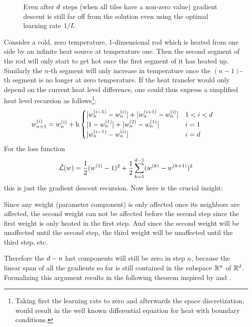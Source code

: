 \begin{figure}[h]
	\centering
	\def\svgwidth{1\textwidth}
	
	\caption{Even after \(d\) steps (when all tiles have a non-zero value)
	gradient descent is still far off from the solution even using the optimal
	learning rate \(1/L\)}
	\label{fig: visualize coloring problem}
\end{figure}
%
Consider a cold, zero temperature, 1-dimensional rod which is heated from one side
by an infinite heat source at temperature one. Then the second segment of the rod
will only start to get hot once the first segment of it has heated up. Similarly
the \(n\)-th segment will only increase in temperature once the \((n-1)\)-th segment
is no longer at zero temperature. If the heat transfer would only depend on the
current heat level difference, one could thus express a simplified heat level
recursion as follows\footnote{
	Taking first the learning rate to zero and afterwards the space discretization, would
	result in the well known differential equation for heat with boundary
	conditions.
}: 
%
\begin{align*}
	\weights_{n+1}^{(i)}
	&= \weights_{n}^{(i)}
	+ \lr 
	\begin{cases}
		[\weights_{n}^{(i-1)} - \weights_{n}^{(i)}] + [\weights_{n}^{(i+1)} - \weights_{n}^{(i)}]
		&  1 < i < \dimension \\
		[1 - \weights_{n}^{(1)}] + [\weights_{n}^{(2)} - \weights_{n}^{(1)}]
		& i = 1 \\
		[\weights_{n}^{(i-1)} - \weights_{n}^{(i)}]
		& i = \dimension
	\end{cases}
\end{align*}
%
For the loss function
%
\begin{align}\label{eq: naive complexity counterexample loss}
	\tilde{\mathcal{L}}(w)
	= \frac12 (w^{(1)}-1)^2
	+ \frac12 \sum_{k=1}^{d-1} (w^{(k)}-w^{(k+1)})^2
\end{align}
%
this is just the gradient descent recursion. Now here is the crucial insight:

Since any weight (parameter component) is only affected once its neighbors are
affected, the second weight can not be affected before the second step since
the first weight is only heated in the first step. And since the second weight
will be unaffected until the second step, the third weight will be unaffected
until the third step, etc.

Therefore the \(d - n\) last components will still be zero in
step \(n\), because the linear span of all the gradients so far is still
contained in the subspace \(\mathbb{R}^n\) of \(\mathbb{R}^d\). Formalizing
this argument results in the following theorem inspired by \textcite[Theorem
2.1.7]{nesterovLecturesConvexOptimization2018} and \textcite{gohWhyMomentumReally2017}.

